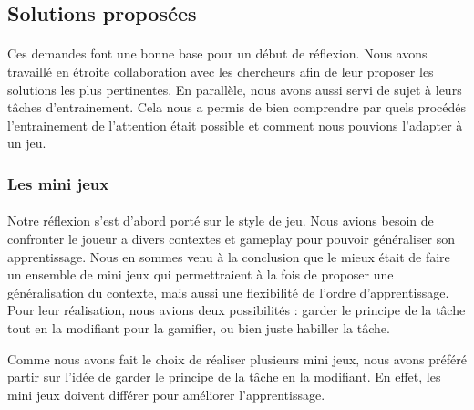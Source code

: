 \subsection{Solutions proposées}

\paragraph{}Ces demandes font une bonne base pour un début de réflexion. Nous avons travaillé en étroite collaboration avec les chercheurs afin de leur proposer les solutions les plus
pertinentes. En parallèle, nous avons aussi servi de sujet à leurs tâches d'entrainement. Cela nous a permis de bien comprendre par quels procédés l'entrainement de l'attention était
possible et comment nous pouvions l'adapter à un jeu.

\subsubsection{Les mini jeux}

\paragraph{}Notre réflexion s'est d'abord porté sur le style de jeu. Nous avions besoin de confronter le joueur a divers contextes et gameplay pour pouvoir généraliser
son apprentissage. Nous en sommes venu à la conclusion que le mieux était de faire un ensemble de mini jeux qui permettraient à la fois de proposer une généralisation du contexte, mais
aussi une flexibilité de l'ordre d'apprentissage. Pour leur réalisation, nous avions deux possibilités : garder le principe de la tâche tout en la modifiant pour la gamifier, ou
bien juste habiller la tâche.

Comme nous avons fait le choix de réaliser plusieurs mini jeux, nous avons préféré partir sur l'idée de garder le principe de la tâche en la modifiant. En effet, les mini jeux doivent
différer pour améliorer l'apprentissage.


